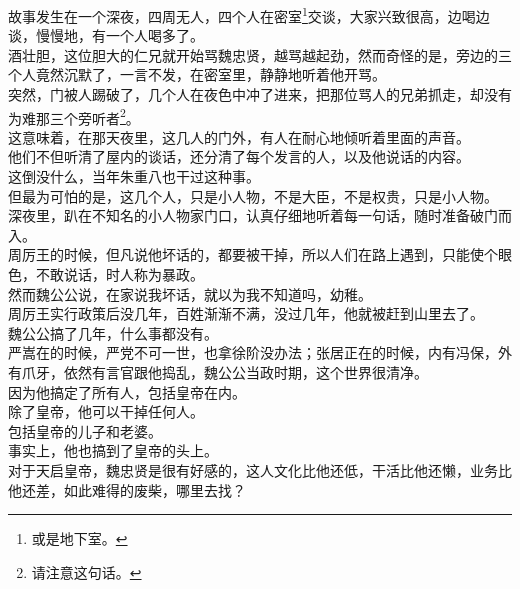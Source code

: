 \begin{multicols}{\theparacolNo}
故事发生在一个深夜，四周无人，四个人在密室\footnote{或是地下室。}交谈，大家兴致很高，边喝边谈，慢慢地，有一个人喝多了。\\

酒壮胆，这位胆大的仁兄就开始骂魏忠贤，越骂越起劲，然而奇怪的是，旁边的三个人竟然沉默了，一言不发，在密室里，静静地听着他开骂。\\

突然，门被人踢破了，几个人在夜色中冲了进来，把那位骂人的兄弟抓走，却没有为难那三个旁听者\footnote{请注意这句话。}。\\

这意味着，在那天夜里，这几人的门外，有人在耐心地倾听着里面的声音。\\

他们不但听清了屋内的谈话，还分清了每个发言的人，以及他说话的内容。\\

这倒没什么，当年朱重八也干过这种事。\\

但最为可怕的是，这几个人，只是小人物，不是大臣，不是权贵，只是小人物。\\

深夜里，趴在不知名的小人物家门口，认真仔细地听着每一句话，随时准备破门而入。\\

周厉王的时候，但凡说他坏话的，都要被干掉，所以人们在路上遇到，只能使个眼色，不敢说话，时人称为暴政。\\

然而魏公公说，在家说我坏话，就以为我不知道吗，幼稚。\\

周厉王实行政策后没几年，百姓渐渐不满，没过几年，他就被赶到山里去了。\\

魏公公搞了几年，什么事都没有。\\

严嵩在的时候，严党不可一世，也拿徐阶没办法；张居正在的时候，内有冯保，外有爪牙，依然有言官跟他捣乱，魏公公当政时期，这个世界很清净。\\

因为他搞定了所有人，包括皇帝在内。\\

除了皇帝，他可以干掉任何人。\\

包括皇帝的儿子和老婆。\\

事实上，他也搞到了皇帝的头上。\\

对于天启皇帝，魏忠贤是很有好感的，这人文化比他还低，干活比他还懒，业务比他还差，如此难得的废柴，哪里去找？\\


\end{multicols}

